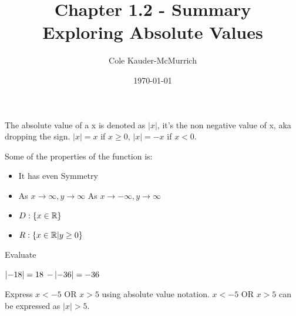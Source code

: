 \documentclass{exam}
\title{\Huge{Chapter 1.2 - Summary}\\\huge{Exploring Absolute Values}}
\author{Cole Kauder-McMurrich}
\date{\today}
\begin{document}
    \maketitle

    The absolute value of a x is denoted as \(|x|\), it's the non negative value of x, aka dropping the sign. \(|x| = x\) if \(x \ge 0 \), \(|x| = -x\) if \(x <  0\).

    Some of the properties of the function is: 
    \begin{itemize}
        \item It has even Symmetry
        \item As \(x \rightarrow \infty,  y \rightarrow \infty\)\hfill\newline
        As \(x \rightarrow -\infty,  y \rightarrow \infty\)
    \item \(D: \{ x \in \mathbb{R}\} \)
    \item \(R: \{ x \in \mathbb{R}| y \ge 0 \} \)
    \end{itemize}

\begin{questions}
    \question Evaluate 

    \begin{answers}{2}
        \answer \(\left|-18\right| = 18\)
        \answer \(-\left|-36\right| = -36\)
    \end{answers}

    \question Express \( x < -5 \text{ OR } x > 5\) using absolute value notation. \hfill\newline
    \( x < -5 \text{ OR } x > 5\) can be expressed as \(|x| > 5\).

\end{questions}
\end{document}
